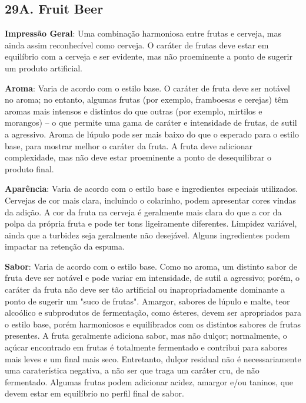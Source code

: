 \subsection*{29A. Fruit Beer}
\textbf{Impressão Geral}: Uma combinação harmoniosa entre frutas e cerveja, mas ainda assim reconhecível como cerveja. O caráter de frutas deve estar em equilíbrio com a cerveja e ser evidente, mas não proeminente a ponto de sugerir um produto artificial.

\textbf{Aroma}: Varia de acordo com o estilo base. O caráter de fruta deve ser notável no aroma; no entanto, algumas frutas (por exemplo, framboesas e cerejas) têm aromas mais intensos e distintos do que outras (por exemplo, mirtilos e morangos) – o que permite uma gama de caráter e intensidade de frutas, de sutil a agressivo. Aroma de lúpulo pode ser mais baixo do que o esperado para o estilo base, para mostrar melhor o caráter da fruta. A fruta deve adicionar complexidade, mas não deve estar proeminente a ponto de desequilibrar o produto final.

\textbf{Aparência}: Varia de acordo com o estilo base e ingredientes especiais utilizados. Cervejas de cor mais clara, incluindo o colarinho, podem apresentar cores vindas da adição. A cor da fruta na cerveja é geralmente mais clara do que a cor da polpa da própria fruta e pode ter tons ligeiramente diferentes. Limpidez variável, ainda que a turbidez seja geralmente não desejável. Alguns ingredientes podem impactar na retenção da espuma.

\textbf{Sabor}: Varia de acordo com o estilo base. Como no aroma, um distinto sabor de fruta deve ser notável e pode variar em intensidade, de sutil a agressivo; porém, o caráter da fruta não deve ser tão artificial ou inapropriadamente dominante a ponto de sugerir um "suco de frutas". Amargor, sabores de lúpulo e malte, teor alcoólico e subprodutos de fermentação, como ésteres, devem ser apropriados para o estilo base, porém harmoniosos e equilibrados com os distintos sabores de frutas presentes. A fruta geralmente adiciona sabor, mas não dulçor; normalmente, o açúcar encontrado em frutas é totalmente fermentado e contribui para sabores mais leves e um final mais seco. Entretanto, dulçor residual não é necessariamente uma caraterística negativa, a não ser que traga um caráter cru, de não fermentado. Algumas frutas podem adicionar acidez, amargor e/ou taninos, que devem estar em equilíbrio no perfil final de sabor.

